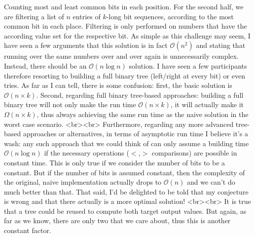 Counting most and least common bits in each position. For the second half, we are filtering a list of $n$ entries of $k$-long bit sequences, according to the most common bit in each place. Filtering is only performed on numbers that have the according value set for the respective bit. As simple as this challenge may seem, I have seen a few arguments that this solution is in fact $\mathcal{O}(n^2)$ and stating that running over the same numbers over and over again is unnecessarily complex. Instead, there should be an $\mathcal{O}(n \log n)$ solution. I have seen a few participants therefore resorting to building a full binary tree (left/right at every bit) or even tries. As far as I can tell, there is some confusion: first, the basic solution is $\mathcal{O}(n \times k)$. Second, regarding full binary tree-based approaches: building a full binary tree will not only make the run time $\mathcal{O}(n \times k)$, it will actually make it $\mathcal{\Omega}(n \times k)$, thus always achieving the same run time as the naive solution in the worst case scenario.
<br><br>
Furthermore, regarding any more advanced tree-based approaches or alternatives, in terms of asymptotic run time I believe it's a wash: any such approach that we could think of can only assume a building time $\mathcal{O}(n \log n)$ if the necessary operations ($<$,$>$ comparisons) are possible in constant time. This is only true if we consider the number of bits to be a constant. But if the number of bits is assumed constant, then the complexity of the original, naive implementation actually drops to  $\mathcal{O}(n)$ and we can't do much better than that. That said, I'd be delighted to be told that my conjecture is wrong and that there actually is a more optimal solution!
<br><br>
It is true that a tree could be reused to compute both target output values. But again, as far as we know, there are only two that we care about, thus this is another constant factor.